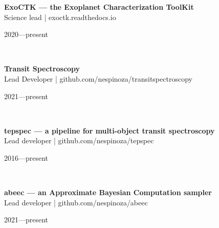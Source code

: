 \documentclass[12pt, a4paper]{article} %
\begin{document}
\begin{minipage}[t]{0.7\textwidth}
\begin{flushleft}%
  \setlength{\leftskip}{0.2cm}%
\textbf{ExoCTK --- the Exoplanet Characterization ToolKit}\\
Science lead | exoctk.readthedocs.io
\end{flushleft}
\end{minipage}
\begin{minipage}[t]{0.3\textwidth}
\hfill 2020---present
\end{minipage}\\

\begin{minipage}[t]{0.7\textwidth}
\begin{flushleft}%
  \setlength{\leftskip}{0.2cm}%
\textbf{Transit Spectroscopy}\\
Lead Developer  | github.com/nespinoza/transitspectroscopy
\end{flushleft}
\end{minipage}
\begin{minipage}[t]{0.3\textwidth}
\hfill 2021---present
\end{minipage}\\

\begin{minipage}[t]{0.7\textwidth}
\begin{flushleft}%
  \setlength{\leftskip}{0.2cm}%
\textbf{tepspec --- a pipeline for multi-object transit spectroscopy}\\
Lead developer | github.com/nespinoza/tepspec
\end{flushleft}
\end{minipage}
\begin{minipage}[t]{0.3\textwidth}
\hfill 2016---present
\end{minipage}\\

\begin{minipage}[t]{0.7\textwidth}
\begin{flushleft}%
  \setlength{\leftskip}{0.2cm}%
\textbf{abeec --- an Approximate Bayesian Computation sampler}\\
Lead developer | github.com/nespinoza/abeec
\end{flushleft}
\end{minipage}
\begin{minipage}[t]{0.3\textwidth}
\hfill 2021---present
\end{minipage}\\
\end{document}

